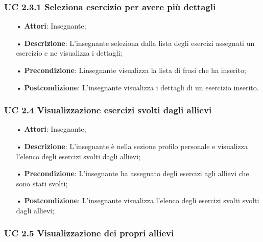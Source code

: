 \subsubsection{UC 2.3.1 Seleziona esercizio per avere più dettagli}
\begin{itemize}
	\item[•] \textbf{Attori}: Insegnante;
	\item[•] \textbf{Descrizione}: L’insegnante seleziona dalla lista degli esercizi assegnati un esercizio e ne visualizza i dettagli;
	\item[•] \textbf{Precondizione}: Linsegnante visualizza la lista di frasi che ha inserito;
	\item[•] \textbf{Postcondizione}: L’insegnante visualizza i dettagli di un esercizio inserito.
\end{itemize}



\subsubsection{UC 2.4 Visualizzazione esercizi svolti dagli allievi}
\begin{itemize}
	\item[•] \textbf{Attori}: Insegnante;
	\item[•] \textbf{Descrizione}:  L’insegnante è nella sezione profilo personale e visualizza l’elenco degli esercizi svolti dagli allievi;
	\item[•] \textbf{Precondizione}:  L’insegnante ha assegnato degli esercizi agli allievi che sono stati svolti;

	\item[•] \textbf{Postcondizione}: L’insegnante visualizza l'elenco degli esercizi svolti svolti dagli allievi; 	
\end{itemize}

\subsubsection{UC 2.5 Visualizzazione dei propri allievi}



